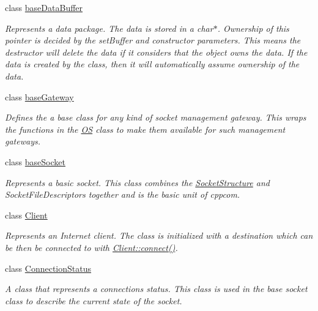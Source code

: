 \begin{DoxyCompactItemize}
\item 
class \hyperlink{class_communication_1_1base_data_buffer}{base\+Data\+Buffer}
\begin{DoxyCompactList}\small\item\em Represents a data package. The data is stored in a char$\ast$. Ownership of this pointer is decided by the set\+Buffer and constructor parameters. This means the destructor will delete the data if it considers that the object owns the data. If the data is created by the class, then it will automatically assume ownership of the data. \end{DoxyCompactList}\item 
class \hyperlink{class_communication_1_1base_gateway}{base\+Gateway}
\begin{DoxyCompactList}\small\item\em Defines the a base class for any kind of socket management gateway. This wraps the functions in the \hyperlink{class_communication_1_1_o_s}{O\+S} class to make them available for such management gateways. \end{DoxyCompactList}\item 
class \hyperlink{class_communication_1_1base_socket}{base\+Socket}
\begin{DoxyCompactList}\small\item\em Represents a basic socket. This class combines the \hyperlink{class_communication_1_1_socket_structure}{Socket\+Structure} and Socket\+File\+Descriptors together and is the basic unit of cppcom. \end{DoxyCompactList}\item 
class \hyperlink{class_communication_1_1_client}{Client}
\begin{DoxyCompactList}\small\item\em Represents an Internet client. The class is initialized with a destination which can be then be connected to with \hyperlink{class_communication_1_1_client_a0fa54f72440e34d7659d6289ce4219d5}{Client\+::connect()}. \end{DoxyCompactList}\item 
class \hyperlink{class_communication_1_1_connection_status}{Connection\+Status}
\begin{DoxyCompactList}\small\item\em A class that represents a connections status. This class is used in the base socket class to describe the current state of the socket. \end{DoxyCompactList}\item 

\end{DoxyCompactItemize}
